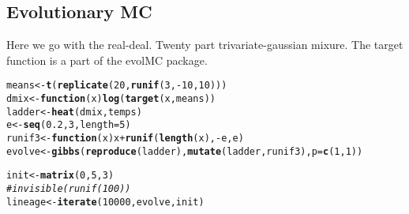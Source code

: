 \documentclass{article}\usepackage[]{graphicx}\usepackage[]{color}
\makeatletter
\newcommand{\hlnum}[1]{\textcolor[rgb]{0.686,0.059,0.569}{#1}}%
\newcommand{\hlcom}[1]{\textcolor[rgb]{0.678,0.584,0.686}{\textit{#1}}}%
\newcommand{\hlopt}[1]{\textcolor[rgb]{0,0,0}{#1}}%
\newcommand{\hlstd}[1]{\textcolor[rgb]{0.345,0.345,0.345}{#1}}%
\newcommand{\hlkwa}[1]{\textcolor[rgb]{0.161,0.373,0.58}{\textbf{#1}}}%
\newcommand{\hlkwb}[1]{\textcolor[rgb]{0.69,0.353,0.396}{#1}}%
\newcommand{\hlkwc}[1]{\textcolor[rgb]{0.333,0.667,0.333}{#1}}%
\newcommand{\hlkwd}[1]{\textcolor[rgb]{0.737,0.353,0.396}{\textbf{#1}}}%
\newenvironment{kframe}{%
 \def\at@end@of@kframe{}%
 \ifinner\ifhmode%
  \def\at@end@of@kframe{\end{minipage}}%
  \begin{minipage}{\columnwidth}%
 \fi\fi%
 \def\FrameCommand##1{\hskip\@totalleftmargin \hskip-\fboxsep
 \colorbox{shadecolor}{##1}\hskip-\fboxsep
     \hskip-\linewidth \hskip-\@totalleftmargin \hskip\columnwidth}%
 \MakeFramed {\advance\hsize-\width
   \@totalleftmargin\z@ \linewidth\hsize
   \@setminipage}}%
 {\par\unskip\endMakeFramed%
 \at@end@of@kframe}
\newenvironment{knitrout}{}{} %
\makeatother
\begin{document}
\subsection{Evolutionary MC}

Here we go with the real-deal. Twenty part trivariate-gaussian mixure.
The target function is a part of the evolMC package. 

\begin{knitrout}
\color{fgcolor}\begin{kframe}
\begin{alltt}
\hlstd{means} \hlkwb{<-} \hlkwd{t}\hlstd{(}\hlkwd{replicate}\hlstd{(}\hlnum{20}\hlstd{,} \hlkwd{runif}\hlstd{(}\hlnum{3}\hlstd{,} \hlopt{-}\hlnum{10}\hlstd{,} \hlnum{10}\hlstd{)))}
\hlstd{dmix} \hlkwb{<-} \hlkwa{function}\hlstd{(}\hlkwc{x}\hlstd{)} \hlkwd{log}\hlstd{(}\hlkwd{target}\hlstd{(x, means))}
\hlstd{ladder} \hlkwb{<-} \hlkwd{heat}\hlstd{(dmix, temps)}
\hlstd{e} \hlkwb{<-} \hlkwd{seq}\hlstd{(}\hlnum{0.2}\hlstd{,} \hlnum{3}\hlstd{,} \hlkwc{length} \hlstd{=} \hlnum{5}\hlstd{)}
\hlstd{runif3} \hlkwb{<-} \hlkwa{function}\hlstd{(}\hlkwc{x}\hlstd{) x} \hlopt{+} \hlkwd{runif}\hlstd{(}\hlkwd{length}\hlstd{(x),} \hlopt{-}\hlstd{e, e)}
\hlstd{evolve} \hlkwb{<-} \hlkwd{gibbs}\hlstd{(}\hlkwd{reproduce}\hlstd{(ladder),} \hlkwd{mutate}\hlstd{(ladder, runif3),} \hlkwc{p} \hlstd{=} \hlkwd{c}\hlstd{(}\hlnum{1}\hlstd{,} \hlnum{1}\hlstd{))}

\hlstd{init} \hlkwb{<-} \hlkwd{matrix}\hlstd{(}\hlnum{0}\hlstd{,} \hlnum{5}\hlstd{,} \hlnum{3}\hlstd{)}
\hlcom{# invisible(runif(100))}
\hlstd{lineage} \hlkwb{<-} \hlkwd{iterate}\hlstd{(}\hlnum{10000}\hlstd{, evolve, init)}
\end{alltt}
\end{kframe}
\end{knitrout}
\end{document}
